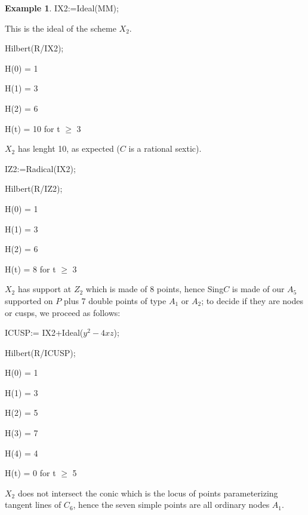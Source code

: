 \documentclass[draft]{amsart}
\theoremstyle{definition}
\theoremstyle{remark}
\theoremstyle{definition}
\newtheorem{ex}[thm]{Example}
\def\a{\bigskip \par \noindent}
\def\dd{\medskip \par \noindent}
\begin{document}
\begin{ex}
IX2:=Ideal(MM);

\noindent This is the ideal of the scheme $X_2$.

\dd Hilbert(R/IX2);

H(0) = 1

H(1) = 3

H(2) = 6

H(t) = 10   for t $\geq$ 3

\noindent $ X_2 $ has lenght 10, as expected ($C$ is a rational sextic).

\dd IZ2:=Radical(IX2);

Hilbert(R/IZ2);

H(0) = 1

H(1) = 3

H(2) = 6

H(t) = 8   for t $\geq$ 3



\dd $X_2$ has support at $Z_2$ which is made of 8 points, hence Sing$C$ is made of  our $A_5$ supported on $P$ plus 7 double points of type $A_1$ or $A_2$; to decide if they are nodes or cusps, we proceed as follows:


\a ICUSP:= IX2+Ideal($y^2-4xz$);

Hilbert(R/ICUSP);

H(0) = 1

H(1) = 3

H(2) = 5

H(3) = 7

H(4) = 4

H(t) = 0   for t $\geq$ 5

\a  $X_2$ does not intersect the conic which is the locus of points parameterizing tangent lines of $C_6$, hence the seven simple points are all ordinary nodes $A_1$.

\end{ex}
\end{document}
